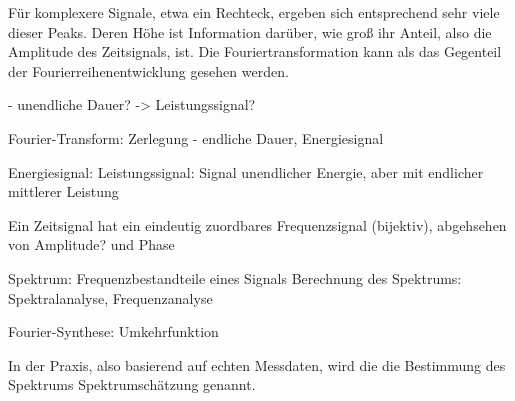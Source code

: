 Für komplexere Signale, etwa ein Rechteck, ergeben sich entsprechend sehr viele dieser Peaks. Deren Höhe ist Information darüber, wie groß ihr Anteil, also die Amplitude des 
Zeitsignals, ist. Die Fouriertransformation kann als das Gegenteil der Fourierreihenentwicklung gesehen werden.


- unendliche Dauer? -> Leistungssignal?

Fourier-Transform: Zerlegung - endliche Dauer, Energiesignal

Energiesignal:
Leistungssignal: Signal unendlicher Energie, aber mit endlicher mittlerer Leistung

Ein Zeitsignal hat ein eindeutig zuordbares Frequenzsignal (bijektiv), abgehsehen von Amplitude? und Phase

Spektrum: Frequenzbestandteile eines Signals
Berechnung des Spektrums: Spektralanalyse, Frequenzanalyse


Fourier-Synthese: Umkehrfunktion

In der Praxis, also basierend auf echten Messdaten, wird die die Bestimmung des Spektrums Spektrumschätzung genannt.
